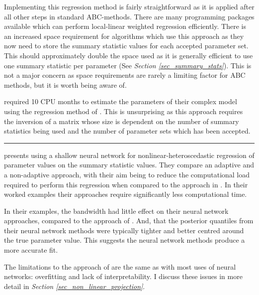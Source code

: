\documentclass[11pt,a4paper]{article}
\theoremstyle{break}
\begin{document}
  \par Implementing this regression method is fairly straightforward as it is applied after all other steps in standard ABC-methods. There are many programming packages available which can perform local-linear weighted regression efficiently. There is an increased space requirement for algorithms which use this approach as they now need to store the summary statistic values for each accepted parameter set. This should approximately double the space used as it is generally efficient to use one summary statistic per parameter (See \textit{Section \ref{sec_summary_stats}}). This is not a major concern as space requirements are rarely a limiting factor for ABC methods, but it is worth being aware of.

  \par \cite[]{statistical_evaluation_of_alternative_models_of_human_evolution} required 10 CPU months to estimate the parameters of their complex model using the regression method of \cite[]{ABC_in_population_genetics}. This is unsurprising as this approach requires the inversion of a matrix whose size is dependent on the number of summary statistics being used and the number of parameter sets which has been accepted.

  \begin{center}
    \noindent\rule{.8\textwidth}{0.4pt}
  \end{center}

  \par \cite[]{non_linear_regression_models_for_abc} presents using a shallow neural network for nonlinear-heteroscedastic regression of parameter values on the summary statistic values. They compare an adaptive and a non-adaptive approach, with their aim being to reduce the computational load required to perform this regression when compared to the approach in \cite[]{ABC_in_population_genetics}. In their worked examples their approaches require significantly less computational time.

  \par In their examples, the bandwidth had little effect on their neural network approaches, compared to the approach of \cite[]{ABC_in_population_genetics}. And, that the posterior quantiles from their neural network methods were typically tighter and better centred around the true parameter value. This suggests the neural network methods produce a more accurate fit.

  \par The limitations to the approach of \cite[]{non_linear_regression_models_for_abc} are the same as with most uses of neural networks: overfitting and lack of interpretability. I discuss these issues in more detail in \textit{Section \ref{sec_non_linear_projection}}.
\end{document}
